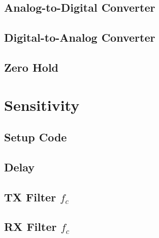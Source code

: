 \documentclass[]{article}
\begin{document}
\subsection{Analog-to-Digital Converter}
\label{app:ad}

\subsection{Digital-to-Analog Converter}
\label{app:da}


\subsection{Zero Hold}
\label{app:zero}



\section{Sensitivity}
\label{app:sensitivity}
\subsection{Setup Code}


\subsection{Delay}
\label{app:delay}


\subsection{TX Filter $f_c$}
\label{app:freqTX}


\subsection{RX Filter $f_c$}
\label{app:freqRX}

\end{document}
